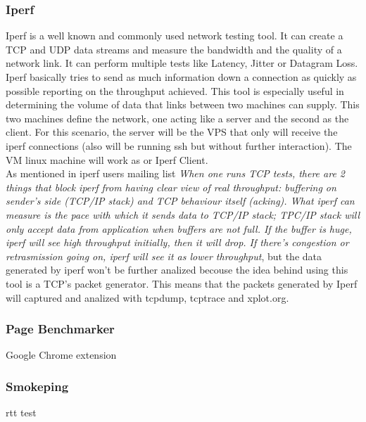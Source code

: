 \subsubsection{Iperf}
Iperf is a well known and commonly used network testing tool. It can create a
TCP and UDP data streams and measure the bandwidth and the quality of a network
link. It can perform multiple tests like Latency, Jitter or Datagram Loss.\\

Iperf basically tries to send as much information down a connection as quickly
as possible reporting on the throughput achieved. This tool is especially useful
in determining the volume of data that links between two machines can supply.
This two machines define the network, one acting like a server and the second as
the client. For this scenario, the server will be the VPS that only will receive
the iperf connections (also will be running ssh but without further
interaction). The VM linux machine will work as or Iperf Client.\\  

As mentioned in iperf users mailing list \textit{
When one runs TCP tests, there are 2 things that block iperf from having clear
view of real throughput: buffering on sender's side (TCP/IP stack) and TCP
behaviour itself (acking). What iperf can measure is the pace with which it
sends data to TCP/IP stack; TPC/IP stack will only accept data from application
when buffers are not full. If the buffer is huge, iperf will see high
throughput initially, then it will drop. If there's congestion or retrasmission
going on, iperf will see it as lower throughput}\cite{iperfmaillist}, but the
data generated by iperf won't be further analized becouse the  idea behind using
this tool is a TCP's packet generator. This means that the packets generated by 
Iperf will captured and analized with tcpdump, tcptrace and xplot.org.\\

\subsubsection{Page Benchmarker}
Google Chrome extension

\subsubsection{Smokeping}
rtt test
